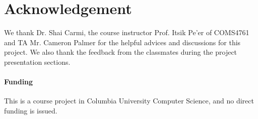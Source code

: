 \documentclass{bioinfo}
\begin{document}
\section*{Acknowledgement}

We thank Dr. Shai Carmi, the course instructor Prof. Itsik Pe'er of COMS4761 and TA Mr. Cameron Palmer for the helpful advices and discussions for this project. We also thank the feedback from the classmates during the project presentation sections.


\paragraph{Funding\textcolon} This is a course project in Columbia University Computer Science, and no
direct funding is issued.




%
%
%
%
%

\end{document}
